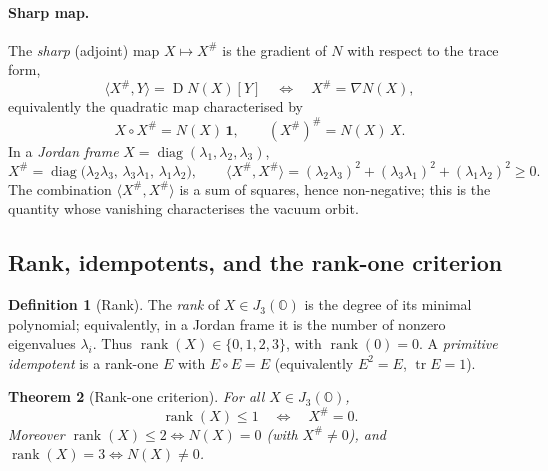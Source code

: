 \documentclass[11pt]{article}
\theoremstyle{plain}
\newtheorem{theorem}{Theorem}[section]
\theoremstyle{definition}
\newtheorem{definition}[theorem]{Definition}
\theoremstyle{remark}
\begin{document}
\paragraph{Sharp map.}
The \emph{sharp} (adjoint) map $X\mapsto X^{\#}$ is the gradient of $N$
with respect to the trace form,
\begin{equation}\label{eq:albert:sharpdef}
  \langle X^{\#}, Y\rangle = \operatorname{D}N(X)[Y]
  \quad\Longleftrightarrow\quad
  X^{\#}=\nabla N(X),
\end{equation}
equivalently the quadratic map characterised by
\begin{equation}\label{eq:albert:sharpid}
  X\circ X^{\#}=N(X)\,\mathbf 1,
  \qquad
  (X^{\#})^{\#}=N(X)\,X .
\end{equation}
In a \emph{Jordan frame} $X=\operatorname{diag}(\lambda_{1},\lambda_{2},\lambda_{3})$,
\begin{equation}\label{eq:albert:sharpframe}
  X^{\#}=\operatorname{diag}\!\bigl(\lambda_{2}\lambda_{3},\,
  \lambda_{3}\lambda_{1},\,\lambda_{1}\lambda_{2}\bigr),
  \qquad
  \langle X^{\#},X^{\#}\rangle
  =(\lambda_{2}\lambda_{3})^{2}+(\lambda_{3}\lambda_{1})^{2}+(\lambda_{1}\lambda_{2})^{2}\ge 0 .
\end{equation}
The combination $\langle X^{\#},X^{\#}\rangle$ is a sum of squares,
hence non-negative; this is the quantity whose vanishing characterises
the vacuum orbit.

\subsection{Rank, idempotents, and the rank-one criterion}
\label{sec:albert:rank}

\begin{definition}[Rank]\label{def:albert:rank}
The \emph{rank} of $X\in J_{3}(\mathbb{O})$ is the degree of its minimal
polynomial; equivalently, in a Jordan frame it is the number of nonzero
eigenvalues $\lambda_{i}$. Thus $\operatorname{rank}(X)\in\{0,1,2,3\}$,
with $\operatorname{rank}(0)=0$. A \emph{primitive idempotent} is a
rank-one $E$ with $E\circ E=E$ (equivalently $E^{2}=E$, $\operatorname{tr}E=1$).
\end{definition}

\begin{theorem}[Rank-one criterion]\label{thm:albert:rankone}
For all $X\in J_{3}(\mathbb{O})$,
\begin{equation}\label{eq:albert:rankone}
  \operatorname{rank}(X)\le 1
  \quad\Longleftrightarrow\quad
  X^{\#}=0 .
\end{equation}
Moreover $\operatorname{rank}(X)\le 2\Leftrightarrow N(X)=0$ (with
$X^{\#}\neq 0$), and $\operatorname{rank}(X)=3\Leftrightarrow N(X)\neq 0$.
\end{theorem}
\end{document}
